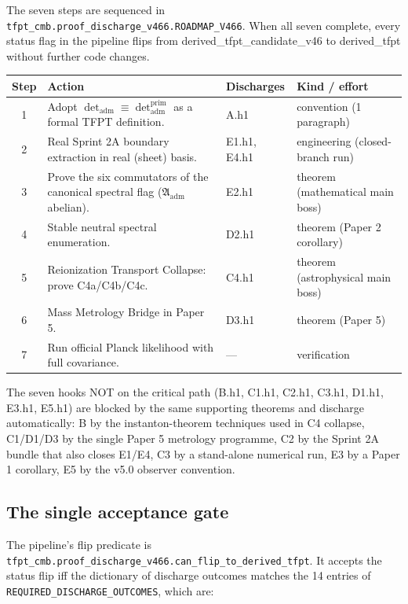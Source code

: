 The seven steps are sequenced in
\texttt{tfpt\_cmb.proof\_discharge\_v466.ROADMAP\_V466}.  When all
seven complete, every status flag in the pipeline flips from
\textsf{derived\_tfpt\_candidate\_v46} to \textsf{derived\_tfpt}
without further code changes.

\begin{center}
\renewcommand{\arraystretch}{1.18}
\begin{tabularx}{\textwidth}{@{}clp{}p{}@{}}
\toprule
\textbf{Step} & \textbf{Action} & \textbf{Discharges} & \textbf{Kind / effort} \\
\midrule
1 & Adopt \(\det_{\mathrm{adm}}\equiv\det_{\mathrm{adm}}^{\mathrm{prim}}\) as a formal TFPT definition. & A.h1 & convention (1 paragraph) \\
2 & Real Sprint 2A boundary extraction in real (sheet) basis. & E1.h1, E4.h1 & engineering (closed-branch run) \\
3 & Prove the six commutators of the canonical spectral flag (\(\mathfrak A_{\mathrm{adm}}\) abelian). & E2.h1 & theorem (mathematical main boss) \\
4 & Stable neutral spectral enumeration. & D2.h1 & theorem (Paper 2 corollary) \\
5 & Reionization Transport Collapse: prove C4a/C4b/C4c. & C4.h1 & theorem (astrophysical main boss) \\
6 & Mass Metrology Bridge in Paper 5. & D3.h1 & theorem (Paper 5) \\
7 & Run official Planck likelihood with full covariance. & --- & verification \\
\bottomrule
\end{tabularx}
\end{center}

The seven hooks NOT on the critical path
(B.h1, C1.h1, C2.h1, C3.h1, D1.h1, E3.h1, E5.h1) are blocked by the
same supporting theorems and discharge automatically: B by the
instanton-theorem techniques used in C4 collapse, C1/D1/D3 by the
single Paper 5 metrology programme, C2 by the Sprint 2A bundle that
also closes E1/E4, C3 by a stand-alone numerical run, E3 by a Paper
1 corollary, E5 by the v5.0 observer convention.

\subsection{The single acceptance gate}

The pipeline's flip predicate is
\texttt{tfpt\_cmb.proof\_discharge\_v466.can\_flip\_to\_derived\_tfpt}.
It accepts the status flip iff the dictionary of discharge outcomes
matches the 14 entries of
\texttt{REQUIRED\_DISCHARGE\_OUTCOMES}, which are:

